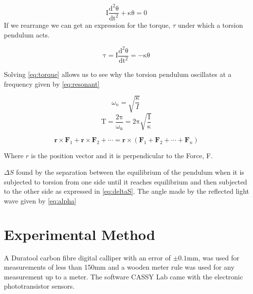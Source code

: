 \documentclass[12pt]{article}
\begin{document}
\begin{equation}
\label{eq:eom}
\mathrm{I\frac{d^2\theta}{dt^2}+ \kappa\theta = 0}
\end{equation}
\noindent 
If we rearrange we can get an expression for the torque, $\tau$ under which a torsion pendulum acts.

\begin{equation} 
\label{eq:torque}
\mathrm{\tau =I\frac{d^2\theta}{dt^2}= -\kappa \theta}
\end{equation}

\noindent 
Solving \cref{eq:torque} allows us to see why the torsion pendulum oscillates at a frequency given by \cref{eq:resonant}

\begin{equation}
\label{eq:resonant}
\omega_n =\sqrt{\frac{\kappa}{I}}\,
\end{equation}
\begin{equation}
\label{eq:period}
\mathrm{T= \frac{2\pi}{\omega_n} = 2\pi \sqrt{\frac{I}{\kappa}}}
\end{equation}


\begin{equation}
\label{eq:moments}
\mathbf{r}\times\mathbf{F}_1 + \mathbf{r}\times\mathbf{F}_2 + \cdots = \mathbf{r}\times(\mathbf{F}_1+\mathbf{F}_2 + \cdots  +\mathbf{F}_n )
\end{equation}

\noindent 
Where $r$ is the position vector and it is perpendicular to the Force, F. 

 $\Delta S$ found by the separation between the equilibrium of the pendulum when it is subjected to torsion from one side until it reaches equilibrium and then subjected to the other side as expressed in \cref{eq:deltaS}. The angle made by the reflected light wave given by \cref{eq:alpha} 
\noindent 



\section{Experimental Method}

A Duratool carbon fibre digital calliper with an error of $\pm{0.1}\mathrm{mm}$, was used for measurements of less than 150mm and a wooden meter rule was used for any measurement up to a meter. The software CASSY Lab came with the electronic phototransistor sensors.

%
%
\end{document}
